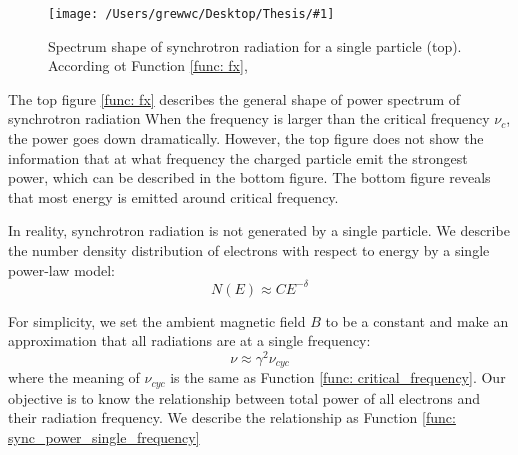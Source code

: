 \documentclass[12pt]{report}
\newcommand{\mycaption}[1]{\protect \caption{#1}}
\newcommand{\singleFig}[3]{
 \begin{figure}[!ht]
  \centering
  \texttt{[image: /Users/grewwc/Desktop/Thesis/\#1]}
  \mycaption{#3}
 \label{fig: #1}
 \end{figure}
}
\begin{document}
            \singleFig{sync_spectrum_loglog_combined}{0.5}{Spectrum shape of synchrotron radiation for a single 
              particle (top). 
             According ot Function \ref{func: fx},}

            The top figure \ref{func: fx} describes the general shape of power spectrum of synchrotron radiation
            When the frequency is larger than
            the critical frequency $\nu_c$, the power goes down dramatically. However, the top figure does not show 
            the information that at what frequency the charged particle emit the strongest power, which can be described
            in the bottom figure. The bottom figure reveals that most energy is emitted around critical frequency. 
  
            In reality, synchrotron radiation is not generated by a single particle. We describe the number 
            density distribution of electrons with respect to energy by a single power-law model:
            \begin{equation}
              \label{func: sync_number_density}
              N\left(E\right) \approx C E^{-\delta}
            \end{equation}
          
            For simplicity, we set the ambient magnetic field $B$ to be a constant and make an approximation 
            that all radiations are at a single frequency:
            \begin{equation}
              \label{func: sync_approximation}
              \nu \approx \gamma^2 \nu_{cyc}
            \end{equation}
            where the meaning of $\nu_{cyc}$ is the same as Function \ref{func: critical_frequency}. 
            Our objective is to know the relationship between total power of all electrons and their radiation 
            frequency. We describe the relationship as Function \ref{func: sync_power_single_frequency}
            
\end{document}
